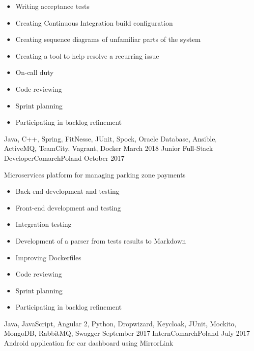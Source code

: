 \begin{experiences}
{\begin{itemize}
                            \item Writing acceptance tests
                            \item Creating Continuous Integration build configuration
                            \item Creating sequence diagrams of unfamiliar parts of the system  
                            \item Creating a tool to help resolve a  recurring issue
                            \item On-call duty
                            \item Code reviewing
                            \item Sprint planning
                            \item Participating in backlog refinement
                        \end{itemize}
                    }
                    {Java, C++, Spring, FitNesse, JUnit, Spock, Oracle Database, Ansible, ActiveMQ, TeamCity, Vagrant, Docker}
  \emptySeparator
  \experience
    {March 2018}     {Junior Full-Stack Developer}{Comarch}{Poland}
    {October 2017}    {
                        Microservices platform for managing parking zone payments
                        \begin{itemize}
                            \item Back-end development and testing
                            \item Front-end development and testing
                            \item Integration testing
                            \item Development of a parser from tests results to Markdown
                            \item Improving Dockerfiles
                            \item Code reviewing
                            \item Sprint planning
                            \item Participating in backlog refinement
                        \end{itemize}
                    }
                    {Java, JavaScript, Angular 2, Python, Dropwizard, Keycloak, JUnit, Mockito, MongoDB, RabbitMQ, Swagger}
  \emptySeparator
  \experience
  {September 2017}       {Intern}{Comarch}{Poland}
  {July 2017}      {
                        Android application for car dashboard using MirrorLink
}
\end{experiences}
